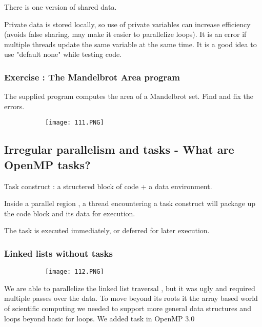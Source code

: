 \documentclass{article}
\begin{document}
There is one version of shared data.

Private data is stored locally, so use of private variables can increase efficiency (avoids false sharing, may make it easier to parallelize loops).
It is an error if multiple threads update the same variable at the same time.
It is a good idea to use "default none" while testing code.

\subsubsection{Exercise : The Mandelbrot Area program}

The supplied program computes the area of a Mandelbrot set. Find and fix the errors. 

\begin{figure}[ht!]
  \centering
  \begin{subfigure}[b]{0.7\linewidth}
    \texttt{[image: 111.PNG]}
  \end{subfigure}
\end{figure}

\subsection{Irregular parallelism and tasks - What are OpenMP tasks?}

Task construct : a structered block of code + a data environment.

Inside a parallel region , a thread encountering a task construct will package up the code block and its data for execution.

The task is executed immediately, or deferred for later execution.

\subsubsection{Linked lists without tasks}


\begin{figure}[ht!]
  \centering
  \begin{subfigure}[b]{0.5\linewidth}
    \texttt{[image: 112.PNG]}
  \end{subfigure}
\end{figure}

We are able to parallelize the linked list traversal , but it was ugly and required multiple passes over the data. To move beyond its roots it the array based world of scientific computing we needed to support more general data structures and loops beyond basic for loops. We added task in OpenMP 3.0
\end{document}
